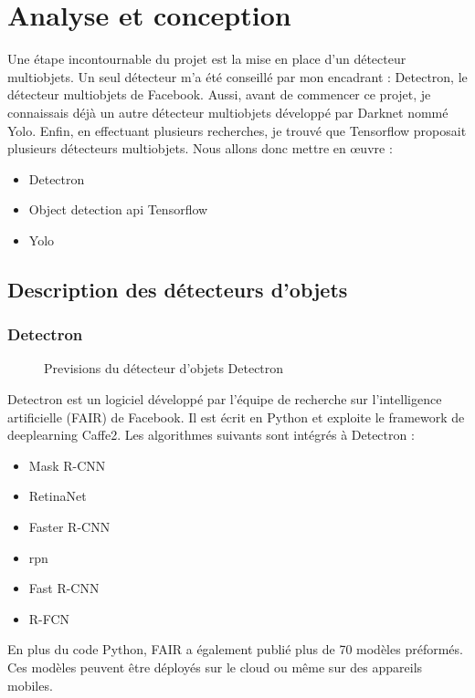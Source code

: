 \documentclass[debug,nodate,hideweeklyreports,noposter]{polytech/polytech}
\begin{document}
\chapter{Analyse et conception}

Une étape incontournable du projet est la mise en place d’un détecteur multiobjets.
Un seul détecteur m’a été conseillé par mon encadrant : Detectron, le détecteur multiobjets de Facebook. Aussi, avant de commencer ce projet, je connaissais déjà un autre détecteur multiobjets développé par Darknet nommé Yolo. Enfin, en effectuant plusieurs recherches, je trouvé que Tensorflow proposait plusieurs détecteurs multiobjets. 
Nous allons donc mettre en œuvre :

\begin{itemize}
\item Detectron
\item Object detection \gls{api} Tensorflow
\item Yolo
\end{itemize}

\section{Description des détecteurs d'objets}

\subsection{Detectron}

\begin{figure}
  \caption{Previsions du détecteur d'objets Detectron}
  \label{fig:imgdetectron}
\end{figure}

Detectron est un logiciel développé par l’équipe de recherche sur l’intelligence artificielle (FAIR) de Facebook. Il est écrit en Python et exploite le \gls{framework} de \gls{deeplearning} Caffe2.
Les algorithmes suivants sont intégrés à Detectron :
\begin{itemize}
\item Mask R-CNN
\item RetinaNet
\item Faster R-CNN
\item \gls{rpn}
\item Fast R-CNN
\item R-FCN
\end{itemize}
En plus du code Python, FAIR a également publié plus de 70 modèles préformés. Ces modèles peuvent être déployés sur le cloud ou même sur des appareils mobiles.
\end{document}
